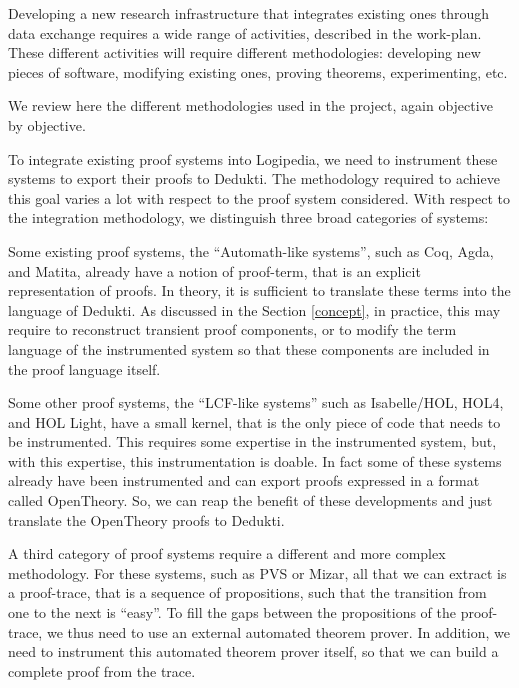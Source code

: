 Developing a new research infrastructure that integrates existing ones
through data exchange requires a wide range of activities, described
in the work-plan. These different activities will require different
methodologies: developing new pieces of software, modifying existing
ones, proving theorems, experimenting, etc.

We review here the different methodologies used in the project, again 
objective by objective.


To integrate existing proof systems into Logipedia, we need to
instrument these systems to export their proofs to
Dedukti. The methodology required to achieve this goal varies a lot
with respect to the proof system considered. With respect to the
integration methodology, we distinguish three broad categories of
systems:

\begin{compactitem}
\item
Some existing proof systems, the ``Automath-like systems'', such as Coq, Agda, and
Matita, already have a notion of proof-term, that is an explicit
representation of proofs.  In theory, it is sufficient to translate
these terms into the language of Dedukti.  As discussed in the Section
\ref{concept}, in practice, this may require to reconstruct transient
proof components, or to modify the term language of the instrumented
system so that these components are included in the proof language
itself.

\item
Some other proof systems, the ``LCF-like systems'' such as
Isabelle/HOL, HOL4, and HOL Light, have a small kernel, that is the
only piece of code that needs to be instrumented. This requires some
expertise in the instrumented system, but, with this expertise, this
instrumentation is doable. In fact some of these systems already have
been instrumented and can export proofs expressed in a format called
OpenTheory. So, we can reap the benefit of these developments and just
translate the OpenTheory proofs to Dedukti.

\item A third category of proof systems require a different and more
  complex methodology. For these systems, such as PVS or Mizar, all
  that we
  can extract is a proof-trace, that is a sequence of propositions,
  such that the transition from one to the next is ``easy''.
  To fill the gaps between the propositions of the proof-trace,
  we thus need to use an external automated theorem prover. In
  addition, we need to instrument this automated theorem prover
  itself, so that we can build a complete proof from the trace.
\end{compactitem}

